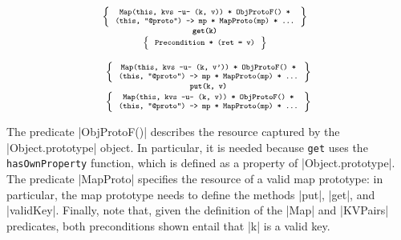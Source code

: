 \noindent
\begin{minipage}{\linewidth}
\begin{displaymath} 
{\scriptsize
\hspace*{-0.2cm}
\begin{array}{c}
\left\{ {\begin{array}{c}
 \text{\texttt{Map(this, kvs -u- (k, v)) * ObjProtoF() *}} \\
 \text{\texttt{(this, "@proto") -> mp * MapProto(mp) * ...}}
\end{array}} \right\} \\
%
\text{\bfseries \texttt{get(k)}} \\[0.2mm]
%
\left\{ {\begin{array}{c}
 \text{\texttt{Precondition * (ret = v)}} 
\end{array}} \right\}
\end{array}
} 
\end{displaymath}
\end{minipage}
\quad
\begin{minipage}{\linewidth}
%
\begin{displaymath} 
{\scriptsize
\begin{array}{c}
\left\{ {\begin{array}{c}
 \text{\texttt{Map(this, kvs -u- (k, v')) * ObjProtoF() *}} \\
 \text{\texttt{(this, "@proto") -> mp * MapProto(mp) * ...}}
\end{array}} \right\} \\
%
\text{\bfseries \texttt{put(k, v)}} \\[0.2mm]
%
\left\{ {\begin{array}{c}
 \text{\texttt{Map(this, kvs -u- (k, v)) * ObjProtoF() *}} \\
 \text{\texttt{(this, "@proto") -> mp * MapProto(mp) * ...}}
\end{array}} \right\}
\end{array}
} 
\end{displaymath}
\end{minipage}

\vspace{10pt}
The predicate \jsinline|ObjProtoF()| describes the resource captured by the \jsinline|Object.prototype| object. 
In particular, it is needed because \texttt{get} uses the \texttt{hasOwnProperty} function, which is defined as a property of \jsinline|Object.prototype|. 
The predicate \jsinline|MapProto| specifies the resource of a valid map prototype: in particular, the map prototype needs to define the methods \jsinline|put|, \jsinline|get|, and \jsinline|validKey|. Finally, note that, given the definition of the \jsinline|Map| and \jsinline|KVPairs| predicates, both preconditions shown entail that \jsinline|k| is a valid key.

